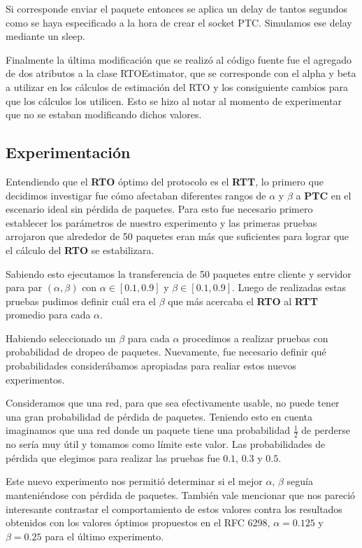 Si corresponde enviar el paquete entonces se aplica un delay de tantos segundos como se haya especificado a la hora de crear el socket PTC. Simulamos ese delay mediante un sleep.\newline

Finalmente la última modificación que se realizó al código fuente fue el agregado de dos atributos a la clase RTOEstimator, que se corresponde con el alpha y beta a utilizar en los cálculos de estimación del RTO y los consiguiente cambios para que los cálculos los utilicen. Esto se hizo al notar al momento de experimentar que no se estaban modificando dichos valores.\newline

\subsection{Experimentación}

Entendiendo que el \textbf{RTO} óptimo del protocolo es el \textbf{RTT}, lo primero que decidimos investigar fue cómo afectaban diferentes rangos de $\alpha$ y $\beta$ a \textbf{PTC} en el escenario ideal sin pérdida de paquetes. Para esto fue necesario primero establecer los parámetros de nuestro experimento y las primeras pruebas arrojaron que alrededor de 50 paquetes eran más que suficientes para lograr que el cálculo del \textbf{RTO} se estabilizara.\newline

Sabiendo esto ejecutamos la transferencia de 50 paquetes entre cliente y servidor para par $(\alpha, \beta)$ con $\alpha \in [0.1, 0.9]$ y $\beta \in [0.1, 0.9]$. Luego de realizadas estas pruebas pudimos definir cuál era el $\beta$ que más acercaba el \textbf{RTO} al \textbf{RTT} promedio para cada $\alpha$.\newline

Habiendo seleccionado un $\beta$ para cada $\alpha$ procedimos a realizar pruebas con probabilidad de dropeo de paquetes. Nuevamente, fue necesario definir qué probabilidades considerábamos apropiadas para realiar estos nuevos experimentos.\newline

Consideramos que una red, para que sea efectivamente usable, no puede tener una gran probabilidad de pérdida de paquetes. Teniendo esto en cuenta imaginamos que una red donde un paquete tiene una probabilidad $\frac{1}{2}$ de perderse no sería muy útil y tomamos como límite este valor. Las probabilidades de pérdida que elegimos para realizar las pruebas fue $0.1$, $0.3$ y $0.5$.\newline

Este nuevo experimento nos permitió determinar si el mejor $\alpha$, $\beta$ seguía manteniéndose con pérdida de paquetes. También vale mencionar que nos pareció interesante contrastar el comportamiento de estos valores contra los resultados obtenidos con los valores óptimos propuestos en el RFC 6298, $\alpha = 0.125$ y $\beta = 0.25$ para el último experimento.

